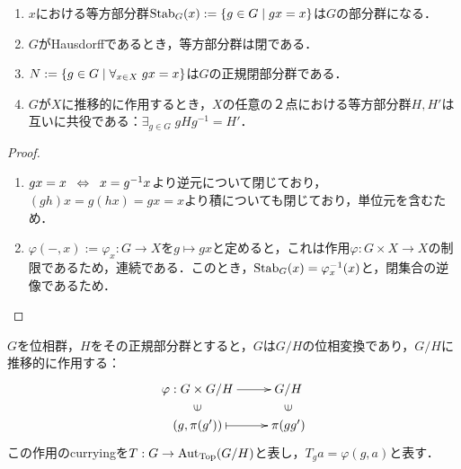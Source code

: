 \documentclass[uplatex,dvipdfmx]{jsreport}
\begin{document}
\begin{lemma}\mbox{}
    \begin{enumerate}
        \item $x$における等方部分群$\mathrm{Stab}_G(x):=\left\{g\in G\mid gx=x\right\}$は$G$の部分群になる．
        \item $G$がHausdorffであるとき，等方部分群は閉である．
        \item $N:=\left\{g\in G\mid \forall_{x\in X}\;gx=x\right\}$は$G$の正規閉部分群である．
        \item $G$が$X$に推移的に作用するとき，$X$の任意の２点における等方部分群$H,H'$は互いに共役である：$\exists_{g\in G}\;gHg^{-1}=H'$．
    \end{enumerate}
\end{lemma}
\begin{proof}\mbox{}
    \begin{enumerate}
        \item $gx=x\;\;\Leftrightarrow\;\; x=g^{-1}x$より逆元について閉じており，$(gh)x=g(hx)=gx=x$より積についても閉じており，単位元を含むため．
        \item $\varphi(-,x):=\varphi_x:G\to X$を$g\mapsto gx$と定めると，これは作用$\varphi:G\times X\to X$の制限であるため，連続である．このとき，$\mathrm{Stab}_G(x)=\varphi_x^{-1}(x)$と，閉集合の逆像であるため．
    \end{enumerate}
\end{proof}

\begin{example}
    $G$を位相群，$H$をその正規部分群とすると，$G$は$G/H$の位相変換であり，$G/H$に推移的に作用する：
    \[\xymatrix@R-2pc{
        \varphi:G\times G/H\ar[r]&G/H\\
        \rotatebox[origin=c]{90}{$\in$}&\rotatebox[origin=c]{90}{$\in$}\\
        (g,\pi(g'))\ar@{|->}[r]&\pi(gg')
    }\]
    この作用のcurryingを$T:G\to\mathrm{Aut}_{\mathrm{Top}}(G/H)$と表し，$T_ga=\varphi(g,a)$と表す．
\end{example}
\end{document}
